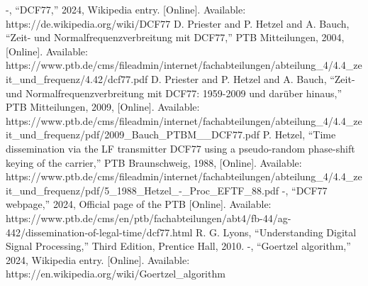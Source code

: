 \documentclass[conference]{IEEEtran}
\begin{document}
\begin{thebibliography}{00}
 -, ``DCF77,'' 2024, Wikipedia entry. [Online]. Available: https://de.wikipedia.org/wiki/DCF77
 D. Priester and P. Hetzel and A. Bauch, ``Zeit- und Normalfrequenzverbreitung mit DCF77,'' PTB Mitteilungen, 2004, [Online]. Available: https://www.ptb.de/cms/fileadmin/internet/fachabteilungen/abteilung\_4/4.4\_zeit\_und\_frequenz/4.42/dcf77.pdf
 D. Priester and P. Hetzel and A. Bauch, ``Zeit- und Normalfrequenzverbreitung mit DCF77: 1959-2009 und darüber hinaus,'' PTB Mitteilungen, 2009, [Online]. Available: https://www.ptb.de/cms/fileadmin/internet/fachabteilungen/abteilung\_4/4.4\_zeit\_und\_frequenz/pdf/2009\_Bauch\_PTBM\_\_DCF77.pdf
 P. Hetzel, ``Time dissemination via the LF transmitter DCF77 using a pseudo-random phase-shift keying of the carrier,'' PTB Braunschweig, 1988, [Online]. Available: https://www.ptb.de/cms/fileadmin/internet/fachabteilungen/abteilung\_4/4.4\_zeit\_und\_frequenz/pdf/5\_1988\_Hetzel\_-\_Proc\_EFTF\_88.pdf
 -, ``DCF77 webpage,'' 2024, Official page of the PTB [Online]. Available: https://www.ptb.de/cms/en/ptb/fachabteilungen/abt4/fb-44/ag-442/dissemination-of-legal-time/dcf77.html
 R. G. Lyons, ``Understanding Digital Signal Processing,'' Third Edition, Prentice Hall, 2010.
 -, ``Goertzel algorithm,'' 2024, Wikipedia entry. [Online]. Available: https://en.wikipedia.org/wiki/Goertzel\_algorithm
\end{thebibliography}
\end{document}
